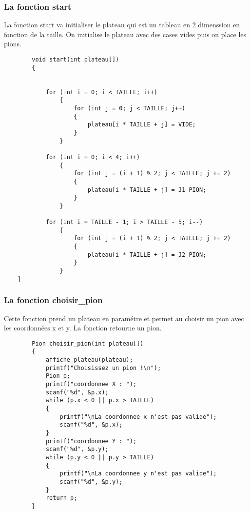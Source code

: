 \documentclass{article}
\begin{document}
    \subsubsection{La fonction start}
        La fonction start va initialiser le plateau qui est un tableau en 2 dimenssion en fonction de la taille.
        On initialise le plateau avec des cases vides puis on place les pions. 
    \begin{lstlisting}
        void start(int plateau[])
        {

            
            for (int i = 0; i < TAILLE; i++)
                {
                    for (int j = 0; j < TAILLE; j++)
                    {
                        plateau[i * TAILLE + j] = VIDE;
                    }
                }

            for (int i = 0; i < 4; i++)
                {
                    for (int j = (i + 1) % 2; j < TAILLE; j += 2)
                    {
                        plateau[i * TAILLE + j] = J1_PION;
                    }
                }

            for (int i = TAILLE - 1; i > TAILLE - 5; i--)
                {
                    for (int j = (i + 1) % 2; j < TAILLE; j += 2)
                    {
                        plateau[i * TAILLE + j] = J2_PION;
                    }
                }
    }
    \end{lstlisting}
    \newpage
    \subsubsection{La fonction choisir\_pion}
    Cette fonction prend un plateau en paramétre et permet au choisir un pion avec les coordonnées x et y.
    La fonction retourne un pion.
    \begin{lstlisting}
        Pion choisir_pion(int plateau[])
        {
            affiche_plateau(plateau);
            printf("Choisissez un pion !\n");
            Pion p;
            printf("coordonnee X : ");
            scanf("%d", &p.x);
            while (p.x < 0 || p.x > TAILLE)
            {
                printf("\nLa coordonnee x n'est pas valide");
                scanf("%d", &p.x);
            }
            printf("coordonnee Y : ");
            scanf("%d", &p.y);
            while (p.y < 0 || p.y > TAILLE)
            {
                printf("\nLa coordonnee y n'est pas valide");
                scanf("%d", &p.y);
            }
            return p;
        }
    \end{lstlisting}
    \newpage
\end{document}
